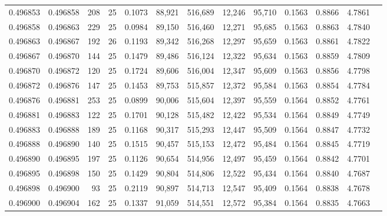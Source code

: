 \begin{tabular}{rrrrrrrrrrrrr}
0.496853 & 0.496858 & 208 &  25 &                                     0.1073 &  88,921 & 516,689 &  12,246 &  95,710 & 0.1563 & 0.8866 & 4.7861 \\
0.496858 & 0.496863 & 229 &  25 &                                     0.0984 &  89,150 & 516,460 &  12,271 &  95,685 & 0.1563 & 0.8863 & 4.7840 \\
0.496863 & 0.496867 & 192 &  26 &                                     0.1193 &  89,342 & 516,268 &  12,297 &  95,659 & 0.1563 & 0.8861 & 4.7822 \\
0.496867 & 0.496870 & 144 &  25 &                                     0.1479 &  89,486 & 516,124 &  12,322 &  95,634 & 0.1563 & 0.8859 & 4.7809 \\
0.496870 & 0.496872 & 120 &  25 &                                     0.1724 &  89,606 & 516,004 &  12,347 &  95,609 & 0.1563 & 0.8856 & 4.7798 \\
0.496872 & 0.496876 & 147 &  25 &                                     0.1453 &  89,753 & 515,857 &  12,372 &  95,584 & 0.1563 & 0.8854 & 4.7784 \\
0.496876 & 0.496881 & 253 &  25 &                                     0.0899 &  90,006 & 515,604 &  12,397 &  95,559 & 0.1564 & 0.8852 & 4.7761 \\
0.496881 & 0.496883 & 122 &  25 &                                     0.1701 &  90,128 & 515,482 &  12,422 &  95,534 & 0.1564 & 0.8849 & 4.7749 \\
0.496883 & 0.496888 & 189 &  25 &                                     0.1168 &  90,317 & 515,293 &  12,447 &  95,509 & 0.1564 & 0.8847 & 4.7732 \\
0.496888 & 0.496890 & 140 &  25 &                                     0.1515 &  90,457 & 515,153 &  12,472 &  95,484 & 0.1564 & 0.8845 & 4.7719 \\
0.496890 & 0.496895 & 197 &  25 &                                     0.1126 &  90,654 & 514,956 &  12,497 &  95,459 & 0.1564 & 0.8842 & 4.7701 \\
0.496895 & 0.496898 & 150 &  25 &                                     0.1429 &  90,804 & 514,806 &  12,522 &  95,434 & 0.1564 & 0.8840 & 4.7687 \\
0.496898 & 0.496900 &  93 &  25 &                                     0.2119 &  90,897 & 514,713 &  12,547 &  95,409 & 0.1564 & 0.8838 & 4.7678 \\
0.496900 & 0.496904 & 162 &  25 &                                     0.1337 &  91,059 & 514,551 &  12,572 &  95,384 & 0.1564 & 0.8835 & 4.7663 \\

\end{tabular}

